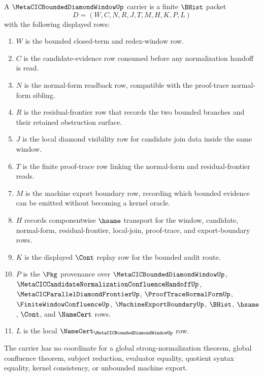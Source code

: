 \begin{definition}
\label{def:metacic-bounded-diamond-window-carrier}
A $\MetaCICBoundedDiamondWindowUp$ carrier is a finite $\BHist$ packet
$$
D=(W,C,N,R,J,T,M,H,K,P,L)
$$
with the following displayed rows:
\begin{enumerate}
\item $W$ is the bounded closed-term and redex-window row.
\item $C$ is the candidate-evidence row consumed before any normalization handoff is read.
\item $N$ is the normal-form readback row, compatible with the proof-trace normal-form sibling.
\item $R$ is the residual-frontier row that records the two bounded branches and their retained obstruction surface.
\item $J$ is the local diamond visibility row for candidate join data inside the same window.
\item $T$ is the finite proof-trace row linking the normal-form and residual-frontier reads.
\item $M$ is the machine export boundary row, recording which bounded evidence can be emitted without becoming a kernel oracle.
\item $H$ records componentwise $\hsame$ transport for the window, candidate, normal-form, residual-frontier, local-join, proof-trace, and export-boundary rows.
\item $K$ is the displayed $\Cont$ replay row for the bounded audit route.
\item $P$ is the $\Pkg$ provenance over $\MetaCICBoundedDiamondWindowUp$, $\MetaCICCandidateNormalizationConfluenceHandoffUp$, $\MetaCICParallelDiamondFrontierUp$, $\ProofTraceNormalFormUp$, $\FiniteWindowConfluenceUp$, $\MachineExportBoundaryUp$, $\BHist$, $\hsame$, $\Cont$, and $\NameCert$ rows.
\item $L$ is the local $\NameCert_{\MetaCICBoundedDiamondWindowUp}$ row.
\end{enumerate}

The carrier has no coordinate for a global strong-normalization theorem, global confluence theorem, subject reduction, evaluator equality, quotient syntax equality, kernel consistency, or unbounded machine export.
\end{definition}

